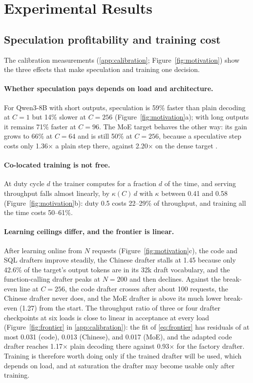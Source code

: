 \documentclass{article}
\begin{document}
\section{Experimental Results}\label{sec:evaluation}

\subsection{Speculation profitability and training cost}\label{sec:measure}

The calibration measurements (\cref{app:calibration}; Figure~\ref{fig:motivation}) show the three effects that make speculation and training one decision.

\paragraph{Whether speculation pays depends on load and architecture.} For Qwen3-8B with short outputs, speculation is 59\% faster than plain decoding at $C{=}1$ but 14\% slower at $C{=}256$ (Figure~\ref{fig:motivation}a); with long outputs it remains 71\% faster at $C{=}96$. The MoE target behaves the other way: its gain grows to 66\% at $C{=}64$ and is still 50\% at $C{=}256$, because a speculative step costs only 1.36$\times$ a plain step there, against 2.20$\times$ on the dense target \citep{huang2025moesd}.

\paragraph{Co-located training is not free.} At duty cycle $d$ the trainer computes for a fraction $d$ of the time, and serving throughput falls almost linearly, by $\kappa(C)\,d$ with $\kappa$ between 0.41 and 0.58 (Figure~\ref{fig:motivation}b): duty 0.5 costs 22--29\% of throughput, and training all the time costs 50--61\%.

\paragraph{Learning ceilings differ, and the frontier is linear.} After learning online from $N$ requests (Figure~\ref{fig:motivation}c), the code and SQL drafters improve steadily, the Chinese drafter stalls at 1.45 because only 42.6\% of the target's output tokens are in its 32k draft vocabulary, and the function-calling drafter peaks at $N{=}200$ and then declines. Against the break-even line at $C{=}256$, the code drafter crosses after about 100 requests, the Chinese drafter never does, and the MoE drafter is above its much lower break-even (1.27) from the start. The throughput ratio of three or four drafter checkpoints at six loads is close to linear in acceptance at every load (Figure~\ref{fig:frontier} in \cref{app:calibration}): the fit of \cref{eq:frontier} has residuals of at most 0.031 (code), 0.013 (Chinese), and 0.017 (MoE), and the adapted code drafter reaches 1.17$\times$ plain decoding there against 0.93$\times$ for the factory drafter. Training is therefore worth doing only if the trained drafter will be used, which depends on load, and at saturation the drafter may become usable only after training.
\end{document}
